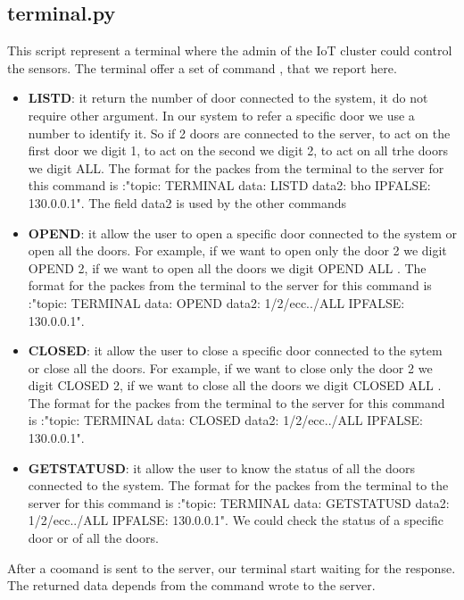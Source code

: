 \subsection{terminal.py}
This script represent a terminal where the admin of the IoT cluster could control the sensors. The terminal offer a set of command , that we report here.
\begin{itemize}
\item \textbf{LISTD}: it return the number of door connected to the system, it do not require other argument. In our system to refer a specific door we use a number to identify it. So if 2 doors are connected to the server, to act on the first door we digit 1, to act on the second we digit 2, to act on all trhe doors we digit ALL. The format for the packes from the terminal to the server for this command is :"topic: TERMINAL data: LISTD data2: bho IPFALSE: 130.0.0.1". The field data2 is used by the other commands
\item \textbf{OPEND}: it allow the user to open a specific door connected to the system or open all the doors. For example, if we want to open only the door 2 we digit OPEND 2, if we want to open all the doors we digit OPEND ALL .  The format for the packes from the terminal to the server for this command is :"topic: TERMINAL data: OPEND data2: 1/2/ecc../ALL IPFALSE: 130.0.0.1".
\item \textbf{CLOSED}: it allow the user to close a specific door connected to the sytem or close all the doors. For example, if we want to close only the door 2 we digit CLOSED 2, if we want to close all the doors we digit CLOSED ALL .  The format for the packes from the terminal to the server for this command is :"topic: TERMINAL data: CLOSED data2: 1/2/ecc../ALL IPFALSE: 130.0.0.1".
\item \textbf{GETSTATUSD}: it allow the user to know the status of all the doors connected to the system. The format for the packes from the terminal to the server for this command is :"topic: TERMINAL data: GETSTATUSD data2: 1/2/ecc../ALL IPFALSE: 130.0.0.1". We could check the status of a specific door or of all the doors. 
\end{itemize}
After a coomand is sent to the server, our terminal start waiting for the response. The returned data depends from the command wrote to the server.
